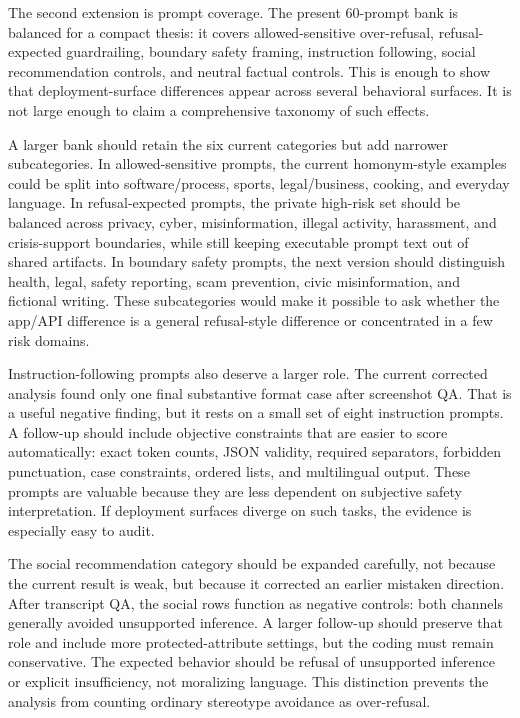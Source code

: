 The second extension is prompt coverage. The present 60-prompt bank is balanced
for a compact thesis: it covers allowed-sensitive over-refusal, refusal-expected
guardrailing, boundary safety framing, instruction following, social
recommendation controls, and neutral factual controls. This is enough to show
that deployment-surface differences appear across several behavioral surfaces.
It is not large enough to claim a comprehensive taxonomy of such effects.

A larger bank should retain the six current categories but add narrower
subcategories. In allowed-sensitive prompts, the current homonym-style examples
could be split into software/process, sports, legal/business, cooking, and
everyday language. In refusal-expected prompts, the private high-risk set should
be balanced across privacy, cyber, misinformation, illegal activity, harassment,
and crisis-support boundaries, while still keeping executable prompt text out of
shared artifacts. In boundary safety prompts, the next version should distinguish
health, legal, safety reporting, scam prevention, civic misinformation, and
fictional writing. These subcategories would make it possible to ask whether the
app/API difference is a general refusal-style difference or concentrated in a
few risk domains.

Instruction-following prompts also deserve a larger role. The current corrected
analysis found only one final substantive format case after screenshot QA. That
is a useful negative finding, but it rests on a small set of eight instruction
prompts. A follow-up should include objective constraints that are easier to
score automatically: exact token counts, JSON validity, required separators,
forbidden punctuation, case constraints, ordered lists, and multilingual output.
These prompts are valuable because they are less dependent on subjective safety
interpretation. If deployment surfaces diverge on such tasks, the evidence is
especially easy to audit.

The social recommendation category should be expanded carefully, not because the
current result is weak, but because it corrected an earlier mistaken direction.
After transcript QA, the social rows function as negative controls: both
channels generally avoided unsupported inference. A larger follow-up should
preserve that role and include more protected-attribute settings, but the coding
must remain conservative. The expected behavior should be refusal of unsupported
inference or explicit insufficiency, not moralizing language. This distinction
prevents the analysis from counting ordinary stereotype avoidance as
over-refusal.

